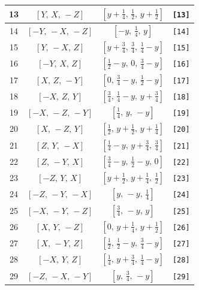 \documentclass[fleqn,8pt]{jsarticle}
\begin{document}
\begin{longtable}{cccc}
13 & $\left[ Y,\, X,\, - Z \right]$ & $\left[ y + \frac{1}{4},\, \frac{1}{2},\, y + \frac{1}{2} \right]$ & {\tt [13]} \\ \hline
14 & $\left[ - Y,\, - X,\, - Z \right]$ & $\left[ - y,\, \frac{1}{4},\, y \right]$ & {\tt [14]} \\ \hline
15 & $\left[ Y,\, - X,\, Z \right]$ & $\left[ y + \frac{3}{4},\, \frac{3}{4},\, \frac{1}{4} - y \right]$ & {\tt [15]} \\ \hline
16 & $\left[ - Y,\, X,\, Z \right]$ & $\left[ \frac{1}{2} - y,\, 0,\, \frac{3}{4} - y \right]$ & {\tt [16]} \\ \hline
17 & $\left[ X,\, Z,\, - Y \right]$ & $\left[ 0,\, \frac{3}{4} - y,\, \frac{1}{2} - y \right]$ & {\tt [17]} \\ \hline
18 & $\left[ - X,\, Z,\, Y \right]$ & $\left[ \frac{3}{4},\, \frac{1}{4} - y,\, y + \frac{3}{4} \right]$ & {\tt [18]} \\ \hline
19 & $\left[ - X,\, - Z,\, - Y \right]$ & $\left[ \frac{1}{4},\, y,\, - y \right]$ & {\tt [19]} \\ \hline
20 & $\left[ X,\, - Z,\, Y \right]$ & $\left[ \frac{1}{2},\, y + \frac{1}{2},\, y + \frac{1}{4} \right]$ & {\tt [20]} \\ \hline
21 & $\left[ Z,\, Y,\, - X \right]$ & $\left[ \frac{1}{4} - y,\, y + \frac{3}{4},\, \frac{3}{4} \right]$ & {\tt [21]} \\ \hline
22 & $\left[ Z,\, - Y,\, X \right]$ & $\left[ \frac{3}{4} - y,\, \frac{1}{2} - y,\, 0 \right]$ & {\tt [22]} \\ \hline
23 & $\left[ - Z,\, Y,\, X \right]$ & $\left[ y + \frac{1}{2},\, y + \frac{1}{4},\, \frac{1}{2} \right]$ & {\tt [23]} \\ \hline
24 & $\left[ - Z,\, - Y,\, - X \right]$ & $\left[ y,\, - y,\, \frac{1}{4} \right]$ & {\tt [24]} \\ \hline
25 & $\left[ - X,\, - Y,\, - Z \right]$ & $\left[ \frac{3}{4},\, - y,\, y \right]$ & {\tt [25]} \\ \hline
26 & $\left[ X,\, Y,\, - Z \right]$ & $\left[ 0,\, y + \frac{1}{4},\, y + \frac{1}{2} \right]$ & {\tt [26]} \\ \hline
27 & $\left[ X,\, - Y,\, Z \right]$ & $\left[ \frac{1}{2},\, \frac{1}{2} - y,\, \frac{3}{4} - y \right]$ & {\tt [27]} \\ \hline
28 & $\left[ - X,\, Y,\, Z \right]$ & $\left[ \frac{1}{4},\, y + \frac{3}{4},\, \frac{1}{4} - y \right]$ & {\tt [28]} \\ \hline
29 & $\left[ - Z,\, - X,\, - Y \right]$ & $\left[ y,\, \frac{3}{4},\, - y \right]$ & {\tt [29]} \\ \hline

\end{longtable}
\end{document}
